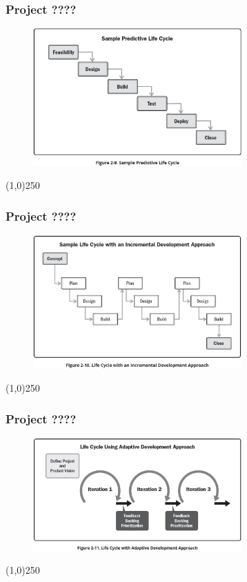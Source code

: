 \begin{frame}
\frametitle{Project ????}
 \begin{figure}
    \centering
        \includegraphics[width = 8cm]{../images/guide/Fig2-9.jpg}
    \label{guidefig:2-9}
 \end{figure}
\end{frame}
\begin{center}\line(1,0){250}\end{center}

\begin{frame}
\frametitle{Project ????}
 \begin{figure}
    \centering
        \includegraphics[width = 8cm]{../images/guide/Fig2-10.jpg}
    \label{guidefig:2-10}
 \end{figure}
\end{frame}
\begin{center}\line(1,0){250}\end{center}

\begin{frame}
\frametitle{Project ????}
 \begin{figure}
    \centering
        \includegraphics[width = 8cm]{../images/guide/Fig2-11.jpg}
    \label{guidefig:2-11}
 \end{figure}
\end{frame}
\begin{center}\line(1,0){250}\end{center}





